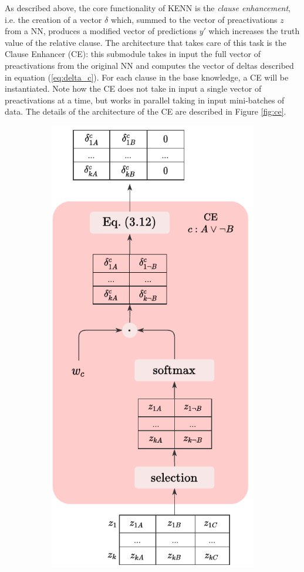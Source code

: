 \textcolor{unipd}{
	As described above, the core functionality of KENN is the \textit{clause enhancement}, i.e. the creation of a vector $\delta$ which, summed to the vector of preactivations $z$ from a NN, produces a modified vector of predictions $y'$ which increases the truth value of the relative clause.}
 The architecture that takes care of this task is the Clause Enhancer (CE): this submodule takes in input the full vector of preactivations from the original NN and computes the vector of deltas described in equation (\ref{eq:delta_c}). For each clause in the base knowledge, a CE will be instantiated. Note how the CE does not take in input a single vector of preactivations at a time, but works in parallel taking in input mini-batches of data. The details of the architecture of the CE are described in Figure \ref{fig:ce}.
\begin{figure}
	\centering
	\begin{subfigure}{.5\textwidth}
		\centering
		\includegraphics[width=0.8\linewidth]{figures/CE.pdf}

\end{subfigure}
\end{figure}
